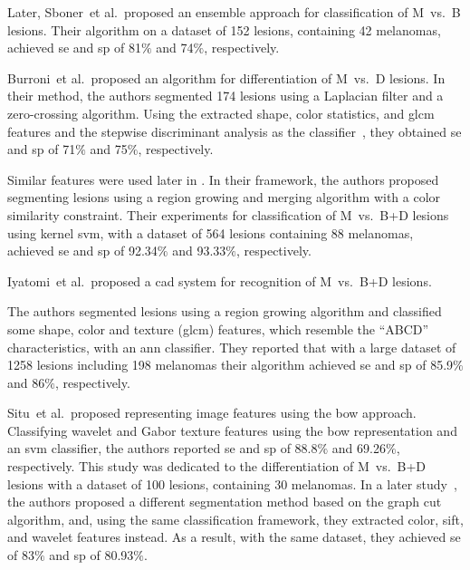 Later, Sboner~et al.\,\cite{sboner2003multiple} proposed an ensemble approach for classification of M~vs.~B lesions.
Their algorithm on a dataset of 152 lesions, containing 42 melanomas, achieved \ac{se} and \ac{sp} of 81$\%$ and 74$\%$, respectively.

Burroni~et al.\,\cite{burroni2005dysplastic} proposed an algorithm for differentiation of M~vs.~D lesions.
In their method, the authors segmented 174 lesions using a Laplacian filter and a zero-crossing algorithm. 
Using the extracted shape, color statistics, and \ac{glcm} features and the stepwise discriminant analysis as the classifier~\cite{burroni2005dysplastic}, they obtained \ac{se} and \ac{sp} of 71$\%$ and 75$\%$, respectively. 

%

Similar features were used later in \cite{celebi2007methodological}.
In their framework, the authors proposed segmenting lesions using a region growing and merging algorithm with a color similarity constraint.
Their experiments for classification of M~vs.~B+D lesions using kernel \ac{svm}, with a dataset of 564 lesions containing 88 melanomas, achieved \ac{se} and \ac{sp} of 92.34$\%$ and 93.33$\%$, respectively.

Iyatomi~et al.\,\cite{iyatomi2008improved} proposed a \ac{cad} system for recognition of M~vs.~B+D lesions.

The authors segmented lesions using a region growing algorithm and classified some shape, color and texture (\ac{glcm}) features, which resemble the ``ABCD'' characteristics, with an \ac{ann} classifier.
They reported that with a large dataset of 1258 lesions including 198 melanomas their algorithm achieved \ac{se} and \ac{sp} of 85.9$\%$ and 86$\%$, respectively.

Situ~et al.\,\cite{situ2008malignant} proposed representing image features using the \ac{bow} approach.
Classifying wavelet and Gabor texture features using the \ac{bow} representation and an \ac{svm} classifier, the authors reported \ac{se} and \ac{sp} of 88.8$\%$ and 69.26$\%$, respectively.
This study was dedicated to the differentiation of M~vs.~B+D lesions with a dataset of 100 lesions, containing 30 melanomas.
In a later study~\cite{situ2010modeling}, the authors proposed a different segmentation method based on the graph cut algorithm, and, using the same classification framework, they extracted color, \ac{sift}, and wavelet features instead.
As a result, with the same dataset, they achieved \ac{se} of 83$\%$ and \ac{sp} of 80.93$\%$. 


